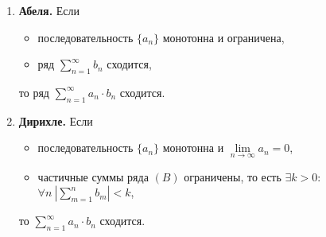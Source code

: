 \begin{theorem}\leavevmode
    \begin{enumerate}
        \item \textbf{Абеля.} Если \begin{itemize}
                  \item последовательность $\{a_n\}$ монотонна и ограничена,
                  \item ряд $\sum_{n=1}^{\infty} b_n$ сходится,
              \end{itemize}
              то ряд $\sum_{n=1}^{\infty}a_n \cdot b_n$ сходится.

        \item \textbf{Дирихле.} Если \begin{itemize}
                  \item последовательность $\{a_n\}$ монотонна и $\underset{n\rightarrow\infty}{\lim}a_n = 0$,
                  \item частичные суммы ряда $(B)$ ограничены, то есть $\exists k > 0: $ \\ $ \forall n \ \left|\sum_{m=1}^{n} b_m\right|< k$,
              \end{itemize}
              то $\sum_{n=1}^{\infty}a_n \cdot b_n$ сходится.
    \end{enumerate}
\end{theorem}

